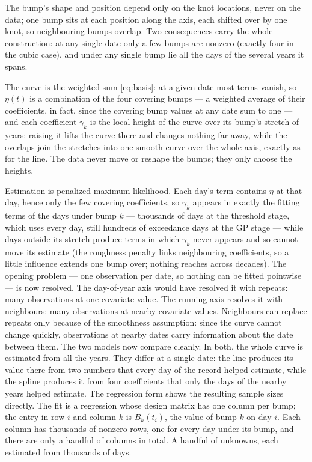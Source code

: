 \documentclass[11pt]{article}
\begin{document}
{The bump's shape and position depend only on the knot locations, never on the data; one bump sits at each position along the axis, each shifted over by one knot, so neighbouring bumps overlap. Two consequences carry the whole construction: at any single date only a few bumps are nonzero (exactly four in the cubic case), and under any single bump lie all the days of the several years it spans.

The curve is the weighted sum \eqref{eq:basis}: at a given date most terms vanish, so $\eta(t)$ is a combination of the four covering bumps — a weighted average of their coefficients, in fact, since the covering bump values at any date sum to one — and each coefficient $\gamma_k$ is the local height of the curve over its bump's stretch of years: raising it lifts the curve there and changes nothing far away, while the overlaps join the stretches into one smooth curve over the whole axis, exactly as for the line. The data never move or reshape the bumps; they only choose the heights.

Estimation is penalized maximum likelihood. Each day's term contains $\eta$ at that day, hence only the few covering coefficients, so $\gamma_k$ appears in exactly the fitting terms of the days under bump $k$ — thousands of days at the threshold stage, which uses every day, still hundreds of exceedance days at the GP stage — while days outside its stretch produce terms in which $\gamma_k$ never appears and so cannot move its estimate (the roughness penalty links neighbouring coefficients, so a little influence extends one bump over; nothing reaches across decades). 
The opening problem — one observation per date, so nothing can be fitted pointwise — is now resolved. The day-of-year axis would have resolved it with repeats: many observations at one covariate value. The running axis resolves it with neighbours: many observations at nearby covariate values. Neighbours can replace repeats only because of the smoothness assumption: since the curve cannot change quickly, observations at nearby dates carry information about the date between them. The two models now compare cleanly. In both, the whole curve is estimated from all the years. They differ at a single date: the line produces its value there from two numbers that every day of the record helped estimate, while the spline produces it from four coefficients that only the days of the nearby years helped estimate. The regression form shows the resulting sample sizes directly. The fit is a regression whose design matrix has one column per bump; the entry in row $i$ and column $k$ is $B_k(t_i)$, the value of bump $k$ on day $i$. Each column has thousands of nonzero rows, one for every day under its bump, and there are only a handful of columns in total. A handful of unknowns, each estimated from thousands of days.}
\end{document}
